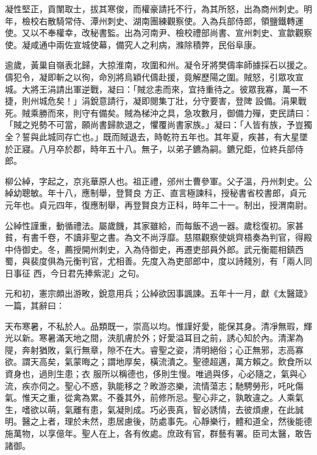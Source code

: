 \begin{pinyinscope}
 凝性堅正，貢闈取士，拔其寒俊，而權豪請托不行，為其所怒，出為商州刺史。明年，檢校右散騎常侍、潭州刺史、湖南團練觀察使。入為兵部侍郎，領鹽鐵轉運
 使。又以不奉權幸，改秘書監。出為河南尹、檢校禮部尚書、宣州刺史、宣歙觀察使。凝咸通中兩佐宣城使幕，備究人之利病，滌除積弊，民俗阜康。



 逾歲，黃巢自嶺表北歸，大掠淮南，攻圍和州。凝令牙將樊儔率師據採石以援之。儔犯令，凝即斬之以徇，命別將烏穎代儔赴援，竟解歷陽之圍。賊怒，引眾攻宣城。大將王涓請出軍逆戰，凝曰：「賊忿恚而來，宜持重待之。彼眾我寡，萬一不捷，則州城危矣！」涓銳意請行，凝即閱集丁壯，分守要害，登陴
 設備。涓果戰死。賊乘勝而來，則守有備矣。賊為梯沖之具，急攻數月，御備力殫，吏民請曰：「賊之兇勢不可當，願尚書歸款退之，懼覆尚書家族。」凝曰：「人皆有族，予豈獨全？誓與此城同存亡也。」既而賊退去，時乾符五年也。其年夏，疾甚，有大星墜於正寢。八月卒於郡，時年五十八。無子，以弟子鑣為嗣。鑣兄鉅，位終兵部侍郎。



 柳公綽，字起之，京兆華原人也。祖正禮，邠州士曹參軍。父子溫，丹州刺史。公綽幼聰敏。年十八，應制舉，登賢良
 方正、直言極諫科，授秘書省校書郎，貞元元年也。貞元四年，復應制舉，再登賢良方正科，時年二十一。制出，授渭南尉。



 公綽性謹重，動循禮法。屬歲饑，其家雖給，而每飯不過一器。歲稔復初。家甚貧，有書千卷，不讀非聖之書。為文不尚浮靡。慈隰觀察使姚齊梧奏為判官，得殿中侍御史。冬，薦授開州刺史，入為侍御史，再遷吏部員外郎。武元衡罷相鎮西蜀，與裴度俱為元衡判官，尤相善。先度入為吏部郎中，度以詩餞別，有「兩人同日事征
 西，今日君先捧紫泥」之句。



 元和初，憲宗頗出游畋，銳意用兵；公綽欲因事諷諫。五年十一月，獻《太醫箴》一篇，其辭曰：



 天布寒暑，不私於人。品類既一，崇高以均。惟謹好愛，能保其身。清凈無瑕，輝光以新。寒暑滿天地之間，浹肌膚於外；好愛溢耳目之前，誘心知於內。清潔為隄，奔射猶敗，氣行無章，隙不在大。睿聖之姿，清明絕俗；心正無邪，志高寡欲。謂天高矣，氣蒙晦之；謂地厚矣，橫流潰之。聖德超邁，萬方賴之。飲食所以資身也，過則生患；衣
 服所以稱德也，侈則生慢。唯過與侈，心必隨之，氣與心流，疾亦伺之。聖心不惑，孰能移之？畋游恣樂，流情蕩志；馳騁勞形，吒叱傷氣。惟天之重，從禽為累。不養其外，前修所忌。聖心非之，孰敢違之。人乘氣生，嗜欲以萌，氣離有患，氣凝則成。巧必喪真，智必誘情，去彼煩慮，在此誠明。醫之上者，理於未然，患居慮後，防處事先。心靜樂行，體和道全，然後能德施萬物，以享億年。聖人在上，各有攸處。庶政有官，群藝有署。臣司太醫，敢告諸御。




\end{pinyinscope}
